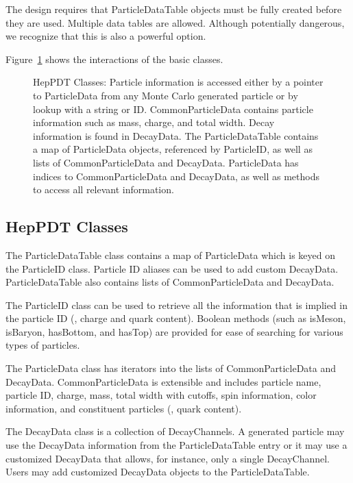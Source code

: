 The design requires that ParticleDataTable objects must be fully created
before they are used.  Multiple data tables are allowed.  Although
potentially dangerous, we recognize that this is also a powerful option.

Figure~\ref{fig:a} shows the interactions of the basic classes.

\begin{figure}
\caption{HepPDT Classes: 
Particle information is accessed either by a pointer to ParticleData from any
Monte Carlo generated particle or by lookup with a string or ID.  
CommonParticleData contains particle information such as mass, charge,
and total width.  Decay information is found in DecayData.
The ParticleDataTable contains a map of ParticleData objects,
referenced by ParticleID, as well as lists of CommonParticleData and DecayData.
ParticleData has indices to CommonParticleData and DecayData, as well as
methods to access all relevant information. }
\label{fig:a}
\end{figure}

\subsection{HepPDT Classes}

The ParticleDataTable class contains a map of ParticleData
which is keyed on the ParticleID class.  Particle ID aliases can be used
to add custom DecayData.  ParticleDataTable also contains lists
of CommonParticleData and DecayData.

The ParticleID
class can be used to retrieve all the information that is implied 
in the particle ID (\eg, charge and quark content).   Boolean methods
(such as isMeson, isBaryon, hasBottom, and hasTop) are provided
for ease of searching for various types of particles.

The ParticleData class has iterators into the lists
of CommonParticleData and DecayData.   CommonParticleData is extensible
and includes particle name, particle ID, charge,
mass, total width with cutoffs, spin information, color information, 
and constituent particles (\eg, quark content).  

The DecayData class is a collection of DecayChannels.
A generated particle may use the DecayData information from the
ParticleDataTable entry or it may use a customized DecayData that
allows, for instance, only a single DecayChannel.
Users may add customized DecayData objects to the ParticleDataTable.

